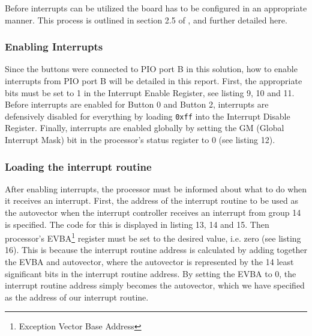 Before interrupts can be utilized the board has to be configured in an appropriate manner. This process is outlined in section 2.5 of \cite{lab-compendium}, and further detailed here.
\subsubsection{Enabling Interrupts}
Since the buttons were connected to PIO port B in this solution, how to enable interrupts from PIO port B will be detailed in this report.
First, the appropriate bits must be set to 1 in the Interrupt Enable Register, see listing 9, 10 and 11.
Before interrupts are enabled for Button 0 and Button 2, interrupts are defensively disabled for everything by loading \texttt{0xff} into the Interrupt Disable Register.
Finally, interrupts are enabled globally by setting the GM (Global Interrupt Mask) bit in the processor's status register to 0 (see listing 12). %
\subsubsection{Loading the interrupt routine}
After enabling interrupts, the processor must be informed about what to do when it receives an interrupt.
First, the address of the interrupt routine to be used as the autovector when the interrupt controller receives an interrupt from group 14 is specified.
The code for this is displayed in listing 13, 14 and 15.
Then processor's EVBA\footnote{Exception Vector Base Address} register must be set to the desired value, i.e. zero (see listing 16).
This is because the interrupt routine address is calculated by adding together the EVBA and autovector, where the autovector is represented by the 14 least significant bits in the interrupt routine address.
By setting the EVBA to 0, the interrupt routine address simply becomes the autovector, which we have specified as the address of our interrupt routine.
